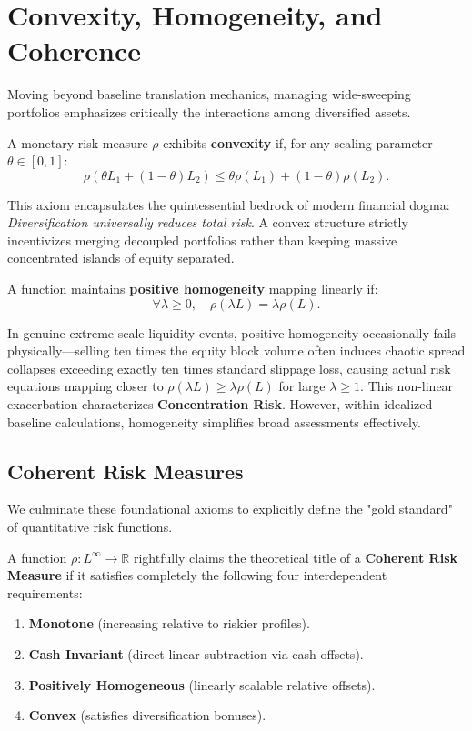 \section{Convexity, Homogeneity, and Coherence}

Moving beyond baseline translation mechanics, managing wide-sweeping portfolios emphasizes critically the interactions among diversified assets.

\begin{definition}[Convexity]
A monetary risk measure $\rho$ exhibits \textbf{convexity} if, for any scaling parameter $\theta \in [0, 1]$:
$$
\rho(\theta L_1 + (1 - \theta) L_2) \leq \theta \rho(L_1) + (1 - \theta) \rho(L_2).
$$
\end{definition}

This axiom encapsulates the quintessential bedrock of modern financial dogma: \textit{Diversification universally reduces total risk}. A convex structure strictly incentivizes merging decoupled portfolios rather than keeping massive concentrated islands of equity separated.

\begin{definition}
A function maintains \textbf{positive homogeneity} mapping linearly if:
$$
\forall \lambda \geq 0, \quad \rho(\lambda L) = \lambda \rho(L).
$$
\end{definition}

In genuine extreme-scale liquidity events, positive homogeneity occasionally fails physically—selling ten times the equity block volume often induces chaotic spread collapses exceeding exactly ten times standard slippage loss, causing actual risk equations mapping closer to $\rho(\lambda L) \geq \lambda \rho(L)$ for large $\lambda \geq 1$. This non-linear exacerbation characterizes \textbf{Concentration Risk}. However, within idealized baseline calculations, homogeneity simplifies broad assessments effectively.

\subsection{Coherent Risk Measures}

We culminate these foundational axioms to explicitly define the "gold standard" of quantitative risk functions.

\begin{definition}
A function $\rho: L^\infty \to \mathbb{R}$ rightfully claims the theoretical title of a \textbf{Coherent Risk Measure} if it satisfies completely the following four interdependent requirements:
\begin{enumerate}
    \item \textbf{Monotone} (increasing relative to riskier profiles).
    \item \textbf{Cash Invariant} (direct linear subtraction via cash offsets).
    \item \textbf{Positively Homogeneous} (linearly scalable relative offsets).
    \item \textbf{Convex} (satisfies diversification bonuses).
\end{enumerate}
\end{definition}

